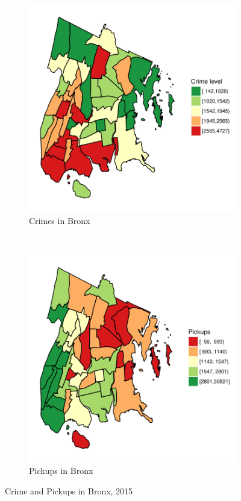 \documentclass{sigkddExp}
\begin{document}
\begin{figure}
    \centering
    \begin{subfigure}[t]{0.5\textwidth}
        \centering
        \includegraphics[width=.9\textwidth]{../img/crimes_per_zone_2015_Bronx}
        \caption{Crimes in Bronx}
    \end{subfigure}%
    ~ 
    \begin{subfigure}[t]{0.5\textwidth}
        \centering
        \includegraphics[width=.9\textwidth]{../img/taxis_2015_Bronx}
        \caption{Pickups in Bronx}
    \end{subfigure}
    \caption{Crime and Pickups in Bronx, 2015}
    \label{Bronx}
  \end{figure}
\end{document}
